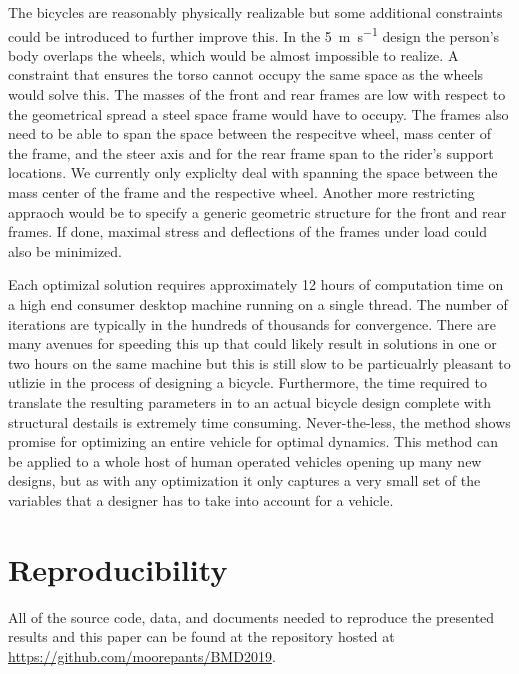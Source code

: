 \documentclass{bmd2019p}
\begin{document}
The bicycles are reasonably physically realizable but some additional
constraints could be introduced to further improve this. In the
5~\si{\meter\per\second} design the person's body overlaps the wheels, which
would be almost impossible to realize. A constraint that ensures the torso
cannot occupy the same space as the wheels would solve this. The masses of the
front and rear frames are low with respect to the geometrical spread a steel
space frame would have to occupy. The frames also need to be able to span the
space between the respecitve wheel, mass center of the frame, and the steer
axis and for the rear frame span to the rider's support locations. We currently
only expliclty deal with spanning the space between the mass center of the
frame and the respective wheel. Another more restricting appraoch would be to
specify a generic geometric structure for the front and rear frames. If done,
maximal stress and deflections of the frames under load could also be
minimized.

Each optimizal solution requires approximately 12 hours of computation time on
a high end consumer desktop machine running on a single thread. The number of
iterations are typically in the hundreds of thousands for convergence. There
are many avenues for speeding this up that could likely result in solutions in
one or two hours on the same machine but this is still slow to be particualrly
pleasant to utlizie in the process of designing a bicycle. Furthermore, the
time required to translate the resulting parameters in to an actual bicycle
design complete with structural destails is extremely time consuming.
Never-the-less, the method shows promise for optimizing an entire vehicle for
optimal dynamics. This method can be applied to a whole host of human operated
vehicles opening up many new designs, but as with any optimization it only
captures a very small set of the variables that a designer has to take into
account for a vehicle.

\section{Reproducibility}
%
All of the source code, data, and documents needed to reproduce the presented
results and this paper can be found at the repository hosted at
\url{https://github.com/moorepants/BMD2019}.



\end{document}
